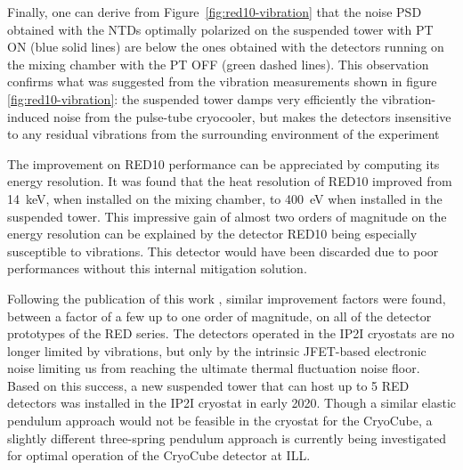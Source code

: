 Finally, one can derive from Figure~\ref{fig:red10-vibration} that the noise PSD obtained with the NTDs optimally polarized on the suspended tower with PT ON (blue solid lines) are below the ones obtained with the detectors running on the mixing chamber with the PT OFF (green dashed lines). This observation confirms what was suggested from the vibration measurements shown in figure \ref{fig:red10-vibration}:  the suspended tower damps very efficiently the vibration-induced noise from the pulse-tube cryocooler, but makes the detectors insensitive to any residual vibrations from the surrounding environment of the experiment

The improvement on RED10 performance can be appreciated by computing its energy resolution. It was found that the heat resolution of RED10 improved from \SI{14}{\kilo\eV}, when installed on the mixing chamber, to \SI{400}{\eV}  when installed in the suspended tower. This impressive gain of almost two orders of magnitude on the energy resolution can be explained by the detector RED10 being especially susceptible to vibrations. This detector would have been discarded due to poor performances without this internal mitigation solution.


Following the publication of this work \cite{Maisonobe:2018tbq}, similar improvement factors were found, between a factor of a few up to one order of magnitude, on all of the detector prototypes of the RED series.
The detectors operated in the IP2I cryostats are no longer limited by vibrations, but only by the intrinsic JFET-based electronic noise limiting us from reaching the ultimate thermal fluctuation noise floor.
Based on this success, a new suspended tower
that can host up to 5 RED detectors was installed in the IP2I cryostat in early 2020.  Though a similar elastic pendulum approach would not be feasible in the \Ricochet{} cryostat for the CryoCube, a slightly different three-spring pendulum approach is currently being investigated  for optimal operation of the CryoCube detector  at ILL.

